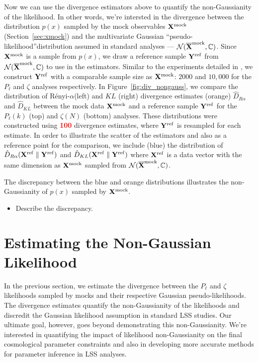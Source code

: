 \documentclass[12pt, letterpaper, preprint]{aastex}
\newcommand{\bitem}{\begin{itemize}}
\newcommand{\eitem}{\end{itemize}}
\newcommand{\todo}[1]{{\bf \textcolor{red}{#1}}}
\newcommand{\Xmock}{{\bf X}^\mathrm{mock}}
\newcommand{\Xref}{{\bf X}^\mathrm{ref}}
\newcommand{\Yref}{{\bf Y}^\mathrm{ref}}
\newcommand{\Ralpha}{R\'enyi-$\alpha$}
\begin{document}
Now we can use the divergence estimators above to quantify the non-Gaussianity 
of the likelihood. In other words, we're intersted in the divergence between
the distribution $p(x)$ sampled by the mock observables $\Xmock$ (Section~\ref{sec:xmock})
and the multivariate Gaussian ``pseudo-likelihood''distribution assumed in 
standard analyses --- $\mathcal{N}(\overline{\bf X}^\mathrm{mock}, \mathbb{C})$. Since
$\Xmock$ is a sample from $p(x)$, we draw a reference sample 
${\bf Y}^\mathrm{ref}$ from $\mathcal{N}(\overline{\bf X}^\mathrm{mock}, \mathbb{C})$ 
to use in the estimators. Similar to the experiments detailed in \cite{poczos2012}, 
we construct ${\bf Y}^\mathrm{ref}$ with a comparable sample size as $\Xmock$: 
$2000$ and $10,000$ for the $P_\ell$ and $\zeta$ analyses respectively. 
In Figure~\ref{fig:div_nongauss}, we compare the distribution of 
\Ralpha (left) and $KL$ (right) divergence estimates (orange)
$\hat{D}_{R\alpha}$ and $\hat{D}_{KL}$
between the mock data ${\bf X}^\mathrm{mock}$ and a reference sample 
${\bf Y}^\mathrm{ref}$ for the $P_\ell(k)$ (top) and $\zeta(N)$ (bottom) analyses.
These distributions were constructed using \todo{100} divergence estimates, 
where $\Yref$ is resampled for each estimate. In order to illustrate the scatter of the estimators and also  
as a reference point for the comparison, we include (blue) 
the distribution of $\hat{D}_{R\alpha}(\Xref \parallel \Yref)$ 
and $\hat{D}_{KL}(\Xref \parallel \Yref)$ where $\Xref$ is a data vector
with the same dimension as $\Xmock$ sampled from $\mathcal{N}(\overline{\bf X}^\mathrm{mock}, \mathbb{C})$.

The discrepancy between the blue and orange distributions illustrates the
non-Gaussianity of $p(x)$ sampled by ${\bf X}^\mathrm{mock}$. 
\bitem 
    \item Describe the discrepancy. 
\eitem

\section{Estimating the Non-Gaussian Likelihood}
In the previous section, we estimate the divergence between the 
$P_\ell$ and $\zeta$ likelihoods sampled by mocks and their respective 
Gaussian pseudo-likelihoods. The divergence estimates quantify 
the non-Gaussianity of the likelihoods and discredit the 
Gaussian likelihood assumption in standard LSS studies. Our ultimate goal, 
however, goes beyond demonstrating this non-Gaussianity. We're interested 
in quantifying the impact of likelihood non-Gaussianity on the final 
cosmological parameter constraints and also in developing more accurate 
methods for parameter inference in LSS analyses.
\end{document}
